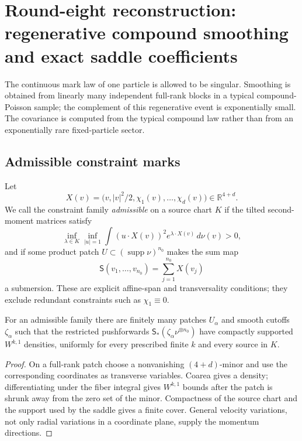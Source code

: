 \section{Round-eight reconstruction: regenerative compound smoothing and exact saddle coefficients}
\label{sec:r8-b1}

The continuous mark law of one particle is allowed to be singular.  Smoothing
is obtained from linearly many independent full-rank blocks in a typical
compound-Poisson sample; the complement of this regenerative event is
exponentially small.  The covariance is computed from the typical compound
law rather than from an exponentially rare fixed-particle sector.

\subsection{Admissible constraint marks}

Let
\[
 X(v)=\bigl(v,|v|^2/2,\chi_1(v),\ldots,\chi_d(v)\bigr)
 \in\mathbb R^{4+d}.
\]
We call the constraint family \emph{admissible} on a source chart $K$ if the
tilted second-moment matrices satisfy
\[
 \inf_{\lambda\in K}\inf_{|u|=1}
 \int (u\cdot X(v))^2e^{\lambda\cdot X(v)}\,d\nu(v)>0,
\]
and if some product patch $U\subset(\operatorname{supp}\nu)^{n_0}$ makes the
sum map
\[
 \mathsf S(v_1,\ldots,v_{n_0})=\sum_{j=1}^{n_0}X(v_j)
\]
a submersion.  These are explicit affine-span and transversality conditions;
they exclude redundant constraints such as $\chi_1\equiv0$.

\begin{lemma}
\label{lem:r8-b1-submersion}
For an admissible family there are finitely many patches $U_\alpha$ and smooth
cutoffs $\zeta_\alpha$ such that the restricted pushforwards
$\mathsf S_*(\zeta_\alpha\nu^{\otimes n_0})$ have compactly supported
$W^{k,1}$ densities, uniformly for every prescribed finite $k$ and every
source in $K$.
\end{lemma}

\begin{proof}
On a full-rank patch choose a nonvanishing $(4+d)$-minor and use the
corresponding coordinates as transverse variables.  Coarea gives a density;
differentiating under the fiber integral gives $W^{k,1}$ bounds after the
patch is shrunk away from the zero set of the minor.  Compactness of the source
chart and the support used by the saddle gives a finite cover.  General
velocity variations, not only radial variations in a coordinate plane, supply
the momentum directions.
\end{proof}

